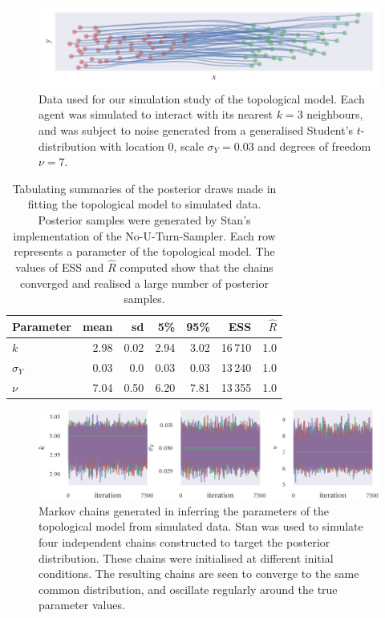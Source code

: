 \begin{figure}[tbp]
  \includegraphics{top_sim.pdf}
  \caption{Data used for our simulation study of the topological model. Each
    agent was simulated to interact with its nearest $k=3$ neighbours, and
    was subject to noise generated from a generalised Student's
    $t$-distribution with location $0$, scale $\sigma_Y=0.03$ and degrees of
    freedom $\nu=7$.}
  \label{fig:top_sim}
\end{figure}
\begin{table}[tbp]
  \begin{tabular}{@{}lrrrrrr@{}}
    \toprule
    Parameter    & mean & sd   & 5\%  & 95\% & ESS     & $\widehat{R}$ \\
    \midrule
    $k$          & 2.98 & 0.02 & 2.94 & 3.02 & 16\,710 & 1.0           \\
    $\sigma_{Y}$ & 0.03 & 0.0  & 0.03 & 0.03 & 13\,240 & 1.0           \\
    $\nu$        & 7.04 & 0.50 & 6.20 & 7.81 & 13\,355 & 1.0           \\
    \bottomrule
  \end{tabular}
  \caption{Tabulating summaries of the posterior draws made in fitting the
    topological model to simulated data. Posterior samples were generated by
    Stan's implementation of the No-U-Turn-Sampler. Each row represents a
    parameter of the topological model. The values of ESS and $\widehat{R}$
    computed show that the chains converged and realised a large number of
    posterior samples.}
  \label{tab:top_summary}
\end{table}
\begin{figure}[tbp]
  \includegraphics{top_trace.pdf}
  \caption{Markov chains generated in inferring the parameters of the
    topological model from simulated data. Stan was used to simulate four
    independent chains constructed to target the posterior distribution.
    These chains were initialised at different initial conditions. The
    resulting chains are seen to converge to the same common distribution, and
    oscillate regularly around the true parameter values.}
  \label{fig:top_trace}
\end{figure}

